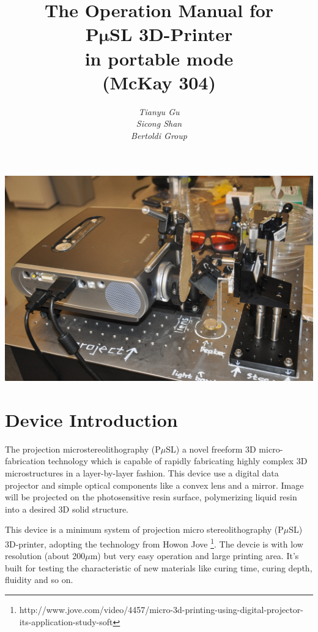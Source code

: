 \documentclass[a4paper]{article}
\title{\textbf{ 
        \Large {The Operation Manual for} \\ 
         \vspace {10pt}
          \Huge {P$\bm{\mu}$SL 3D-Printer } \\
           \vspace {10pt}
           	\LARGE {in portable mode}	\\
             \vspace {10pt}
              \Large{(McKay 304)}
               \vspace {20pt}
              }}
\author{\textit{Tianyu Gu} \\
				\textit{Sicong Shan} \\
				\textit{Bertoldi Group}}
\begin{document}
	\maketitle
	 \vspace{50pt}

	\centering
	 \includegraphics[width=400pt]{frontpic.jpg}
	\clearpage

	\tableofcontents 
	\clearpage

	\raggedright

	\section{Device Introduction}\label{sec:device-introduction}
		The projection microstereolithography (P$\mu$SL) a novel freeform 3D micro-fabrication technology 
		which is capable of rapidly fabricating highly complex 3D microstructures in a layer-by-layer fashion. 
		This device use a digital data projector and simple optical components like a convex lens and a mirror. 
		Image will be projected on the photosensitive resin surface, polymerizing liquid resin into a desired 
		3D solid structure. \\ 
		\vspace{10pt}

		This device is a minimum system of projection micro stereolithography (P$\mu$SL) 3D-printer, adopting the
		technology from Howon Jove \footnote{http://www.jove.com/video/4457/micro-3d-printing-using-digital-projector-its-application-study-soft}.
		The devcie is with low resolution (about 200$\mu$m) but very easy operation and large printing area. 
		It's built for testing the characteristic of new materials like curing time, curing depth, fluidity and so on. \\
		\vspace{10pt}
\end{document}
